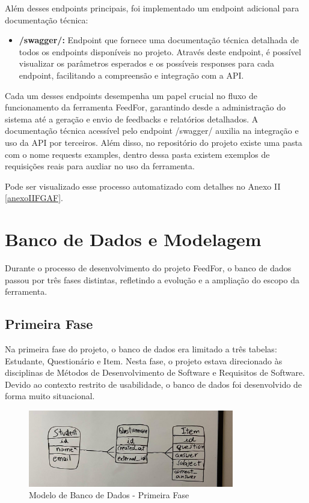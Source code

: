 Além desses endpoints principais, foi implementado um endpoint adicional para documentação técnica:

\begin{itemize}
    \item \textbf{/swagger/:} Endpoint que fornece uma documentação técnica detalhada de todos os endpoints disponíveis no projeto. Através deste endpoint, é possível visualizar os parâmetros esperados e os possíveis responses para cada endpoint, facilitando a compreensão e integração com a API.
\end{itemize}

Cada um desses endpoints desempenha um papel crucial no fluxo de funcionamento da ferramenta FeedFor, garantindo desde a administração do sistema até a geração e envio de feedbacks e relatórios detalhados. A documentação técnica acessível pelo endpoint /swagger/ auxilia na integração e uso da API por terceiros. Além disso, no repositório do projeto existe uma pasta com o nome requests examples, dentro dessa pasta existem exemplos de requisições reais para auxliar no uso da ferramenta.

Pode ser visualizado esse processo automatizado com detalhes no Anexo II \ref{anexoIIFGAF}.

\section{Banco de Dados e Modelagem}

Durante o processo de desenvolvimento do projeto FeedFor, o banco de dados passou por três fases distintas, refletindo a evolução e a ampliação do escopo da ferramenta.

\subsection{Primeira Fase}

Na primeira fase do projeto, o banco de dados era limitado a três tabelas: Estudante, Questionário e Item. Nesta fase, o projeto estava direcionado às disciplinas de Métodos de Desenvolvimento de Software e Requisitos de Software. Devido ao contexto restrito de usabilidade, o banco de dados foi desenvolvido de forma muito situacional.

\begin{figure}[H]
    \centering
    \includegraphics[width=0.8\textwidth]{figuras/bd-phase1.jpeg}
    \caption{Modelo de Banco de Dados - Primeira Fase}
    \label{fig:first_phase}
\end{figure}

